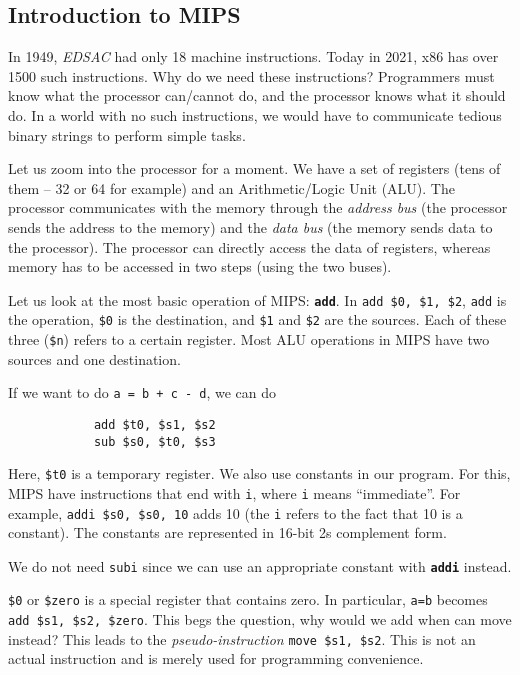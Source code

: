 \documentclass{article}
\begin{document}
	\subsection{Introduction to MIPS}

		In 1949, \emph{EDSAC} had only 18 machine instructions. Today in 2021, x86 has over 1500 such instructions. Why do we need these instructions? Programmers must know what the processor can/cannot do, and the processor knows what it should do. In a world with no such instructions, we would have to communicate tedious binary strings to perform simple tasks. 

		Let us zoom into the processor for a moment. We have a set of registers (tens of them -- 32 or 64 for example) and an Arithmetic/Logic Unit (ALU). The processor communicates with the memory through the \emph{address bus} (the processor sends the address to the memory) and the \emph{data bus} (the memory sends data to the processor). The processor can directly access the data of registers, whereas memory has to be accessed in two steps (using the two buses).

		Let us look at the most basic operation of MIPS: \textbf{\texttt{add}}. In \texttt{add \$0, \$1, \$2}, \texttt{add} is the operation, \texttt{\$0} is the destination, and \texttt{\$1} and \texttt{\$2} are the sources. Each of these three (\texttt{\$n}) refers to a certain register. Most ALU operations in MIPS have two sources and one destination.

		If we want to do \texttt{a = b + c - d}, we can do
		\begin{verbatim}
			add $t0, $s1, $s2
			sub $s0, $t0, $s3
		\end{verbatim}
		Here, \texttt{\$t0} is a temporary register. We also use constants in our program. For this, MIPS have instructions that end with \texttt{i}, where \texttt{i} means ``immediate''. For example, \texttt{addi \$s0, \$s0, 10} adds 10 (the \texttt{i} refers to the fact that 10 is a constant). The constants are represented in 16-bit 2s complement form.

		We do not need \texttt{subi} since we can use an appropriate constant with \textbf{\texttt{addi}} instead.

		\texttt{\$0} or \texttt{\$zero} is a special register that contains zero. In particular, \texttt{a=b} becomes \texttt{add \$s1, \$s2, \$zero}. This begs the question, why would we add when can move instead? This leads to the \emph{pseudo-instruction} \texttt{move \$s1, \$s2}. This is not an actual instruction and is merely used for programming convenience.
\end{document}
